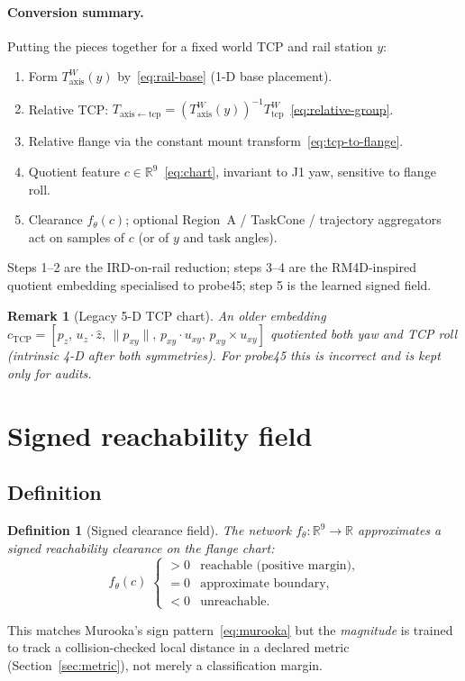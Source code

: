 \documentclass[11pt,a4paper]{article}
\newtheorem{definition}{Definition}
\newtheorem{remark}{Remark}
\newcommand{\R}{\mathbb{R}}
\newcommand{\Tcp}{T_{\mathrm{tcp}}}
\newcommand{\Taxis}{T_{\mathrm{axis}}}
\begin{document}
\paragraph{Conversion summary.}
Putting the pieces together for a fixed world TCP and rail station \(y\):
\begin{enumerate}[leftmargin=1.4em]
  \item Form \(\Taxis^{W}(y)\) by~\eqref{eq:rail-base} (1-D base placement).
  \item Relative TCP: \(T_{\mathrm{axis\leftarrow tcp}}
        =(\Taxis^{W}(y))^{-1}\Tcp^{W}\)~\eqref{eq:relative-group}.
  \item Relative flange via the constant mount
        transform~\eqref{eq:tcp-to-flange}.
  \item Quotient feature \(c\in\R^{9}\)~\eqref{eq:chart}, invariant to J1 yaw,
        sensitive to flange roll.
  \item Clearance \(f_{\theta}(c)\); optional Region~A / TaskCone / trajectory
        aggregators act on samples of \(c\) (or of \(y\) and task angles).
\end{enumerate}
Steps 1--2 are the IRD-on-rail reduction; steps 3--4 are the
RM4D-inspired quotient embedding specialised to probe45; step 5 is the
learned signed field.

\begin{remark}[Legacy 5-D TCP chart]
An older embedding
\(c_{\mathrm{TCP}}=[p_{z},\,u_{z}\!\cdot\!\hat z,\,\|p_{xy}\|,\,
p_{xy}\!\cdot\!u_{xy},\,p_{xy}\times u_{xy}]\)
quotiented both yaw and TCP roll (intrinsic 4-D after both symmetries).
For probe45 this is incorrect and is kept only for audits.
\end{remark}

\section{Signed reachability field}
\label{sec:field}

\subsection{Definition}
\label{sec:field-def}

\begin{definition}[Signed clearance field]
The network \(f_{\theta}:\R^{9}\to\R\) approximates a signed reachability
clearance on the flange chart:
\begin{equation}
\label{eq:sign-convention}
  f_{\theta}(c)
  \;
  \begin{cases}
    >0 & \text{reachable (positive margin)},\\
    =0 & \text{approximate boundary},\\
    <0 & \text{unreachable}.
  \end{cases}
\end{equation}
\end{definition}
This matches Murooka's sign pattern~\eqref{eq:murooka} but the \emph{magnitude}
is trained to track a collision-checked local distance in a declared metric
(Section~\ref{sec:metric}), not merely a classification margin.
\end{document}
